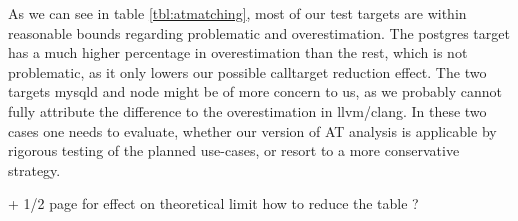 As we can see in table \ref{tbl:atmatching}, most of our test targets are within reasonable bounds regarding problematic and overestimation. The postgres target has a much higher percentage in overestimation than the rest, which is not problematic, as it only lowers our possible calltarget reduction effect. The two targets mysqld and node might be of more concern to us, as we probably cannot fully attribute the difference to the overestimation in llvm/clang. In these two cases one needs to evaluate, whether our version of AT analysis is applicable by rigorous testing of the planned use-cases, or resort to a more conservative strategy.

\begin{table}
		\caption {Table shows the effect of the various AT filtering versions on the policies AT, COUNT* (theoretical limit of COUNT policy) and TYPE* (theoretical limit of TYPE policy) for all of our test targets}
	\label{tbl:attheoreticaleffect}
\end{table}

+ 1/2 page for effect on theoretical limit
how to reduce the table ?




